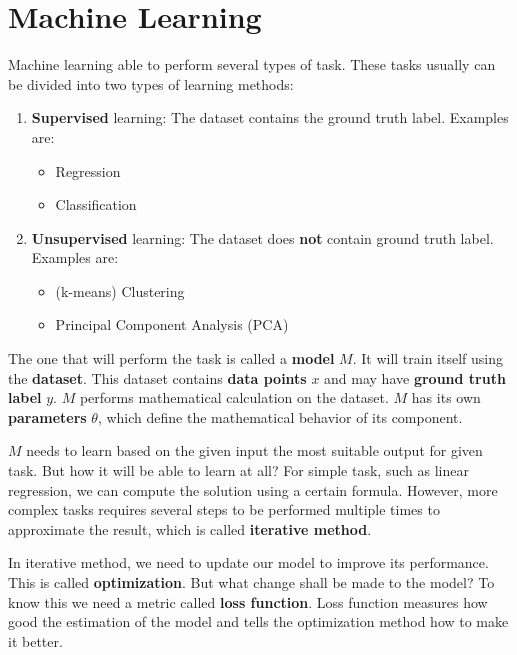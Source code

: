 \documentclass[10pt]{article}
\begin{document}
\newpage

\section{Machine Learning}

Machine learning able to perform several types of task. These tasks 
usually can be divided into two types of learning methods:

\begin{enumerate}
    \item \textbf{Supervised} learning: The dataset contains the ground 
        truth label. Examples are:
        \begin{itemize}
            \item Regression 
            \item Classification
        \end{itemize}
    \item \textbf{Unsupervised} learning: The dataset does \textbf{not}
        contain ground truth label. Examples are:
        \begin{itemize}
            \item (k-means) Clustering
            \item Principal Component Analysis (PCA)
        \end{itemize}
\end{enumerate}

The one that will perform the task is called a \textbf{model} $M$. It 
will train itself using the \textbf{dataset}. This dataset 
contains \textbf{data points} $x$ and may have \textbf{ground truth label}
$y$. $M$ performs mathematical calculation on the dataset. $M$ 
has its own \textbf{parameters} $\theta$, which define the mathematical behavior of 
its component.

$M$ needs to learn based on the given input the most suitable output for given 
task. But how it will be able to learn at all? For simple task, such as linear 
regression, we can compute the solution using a certain formula. However,
more complex tasks requires several steps to be performed 
multiple times to approximate the result, which is called 
\textbf{iterative method}.

In iterative method, we need to update our model to 
improve its performance. This is called \textbf{optimization}. 
But what change shall be made to the model? To know this we need 
a metric called \textbf{loss function}. Loss function measures 
how good the estimation of the model and tells the optimization 
method how to make it better.
\end{document}
